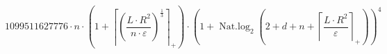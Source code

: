 \[1099511627776 \cdot n \cdot \left(1 + \left\lceil \left(\frac{L \cdot R^{2}}{n \cdot \varepsilon}\right)^{\frac{1}{3}} \right\rceil_{+}\right) \cdot \left(1 + \operatorname{Nat.log}_{2}\left(2 + d + n + \left\lceil \frac{L \cdot R^{2}}{\varepsilon} \right\rceil_{+}\right)\right)^{4}\]
